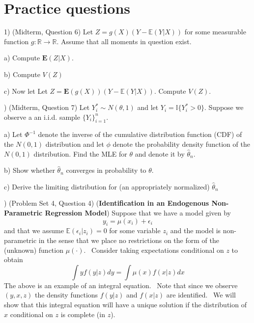 \documentclass[12pt,english]{article}
\newcommand{\expec}{\ensuremath{\mathbb E}}
\begin{document}
\section{Practice questions}

1) (Midterm, Question 6) Let $Z=g(X)(Y-\expec(Y|X))$ for some measurable  function $g:\mathbb{R}\rightarrow\mathbb{R}$. Assume that all moments in
question exist.

a) Compute $\mathbf{E}(Z|X)$.

b) Compute $V(Z)$

c) Now let Let $Z=\mathbf{E}(g(X))(Y-\expec(Y|X))$. Compute $V(Z)$.

\vspace{1em}
) (Midterm, Question 7) Let $Y_{i}^{*}\sim N(\theta,1)$ and let
$Y_{i}=\mathbb{I}\{Y_{i}^{*}>0\}$. Suppose we observe a an i.i.d. sample
$\{Y_{i}\}_{i=1}^{n}$.

a) Let $\Phi^{-1}$ denote the inverse of the cumulative
distribution function (CDF) of the $N(0,1)$ distribution and
let $\phi$ denote the probability density function of the
$N(0,1)$ distribution. Find
the MLE for $\theta$ and denote it by $\hat{\theta}_{n}$.  

b) Show whether $\hat{\theta}_{n}$ converges in probability to  $\theta$. 

c) Derive the limiting distribution for (an appropriately
normalized) $\hat{\theta}_{n}$

\vspace{1em}
) (Problem Set 4, Question 4) (\textbf{Identification in an Endogenous Non-Parametric Regression Model})  Suppose that we have a model given by%
\begin{equation*}
y_{i}=\mu \left( x_{i}\right) +\epsilon _{i}
\end{equation*}%
and that we assume $\mathbb{E}\left( \epsilon _{i}|z_{i}\right) =0$
for some variable $z_{i}$ and the model is non-parametric in the sense
that we place no restrictions on the form of the (unknown) function $\mu
\left( \cdot \right) .$ \ Consider taking expectations conditional on
$z$ to obtain%
\begin{equation*}
\int yf\left( y|z\right) dy=\int \mu \left( x\right) f\left( x|z\right) dx
\end{equation*}%
The above is an example of an integral equation. \ Note that since we
observe $\left( y,x,z\right) $ the density functions $f\left( y|z\right) $
and $f\left( x|z\right) $ are identified. \ We will show that this integral
equation will have a unique solution if the distribution of $x$ conditional
on $z$ is complete (in $z$). 
\end{document}
